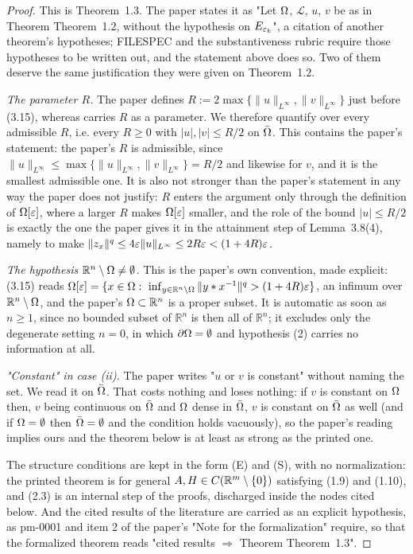 \begin{proof}
This is Theorem~1.3. The paper states it as "Let $\Omega$, $\mathcal L$, $u$, $v$ be as in
Theorem Theorem~1.2, without the hypothesis on $E_{\varepsilon_k}$", a citation of another theorem's
hypotheses; FILESPEC and the substantiveness rubric require those hypotheses to be written
out, and the statement above does so. Two of them deserve the same justification they were
given on Theorem~1.2.

\emph{The parameter $R$.} The paper defines $R:=2\max\{\|u\|_{L^\infty},\|v\|_{L^\infty}\}$
just before (3.15), whereas  carries $R$ as a parameter. We
therefore quantify over every admissible $R$, i.e. every $R\ge0$ with $|u|,|v|\le R/2$ on
$\bar{\Omega}$. This contains the paper's statement: the paper's $R$ is admissible, since
$\|u\|_{L^\infty}\le\max\{\|u\|_{L^\infty},\|v\|_{L^\infty}\}=R/2$ and likewise for $v$, and
it is the smallest admissible one. It is also not stronger than the paper's statement in any
way the paper does not justify: $R$ enters the argument only through the definition of
$\Omega[\varepsilon]$, where a larger $R$ makes $\Omega[\varepsilon]$ smaller, and the role of the bound
$|u|\le R/2$ is exactly the one the paper gives it in the attainment step of Lemma~3.8(4),
namely to make $\|z_x\|^{q}\le4\varepsilon\|u\|_{L^\infty}\le2R\varepsilon<(1+4R)\varepsilon$.

\emph{The hypothesis $\mathbb R^{n}\setminus\Omega\ne\emptyset$.} This is the paper's own
convention, made explicit: (3.15) reads
$\Omega[\varepsilon]=\{x\in\Omega:\ \inf_{y\in\mathbb R^{n}\setminus\Omega}\|y*x^{-1}\|^{q}>(1+4R)\varepsilon\}$, an
infimum over $\mathbb R^{n}\setminus\Omega$, and the paper's $\Omega\subset\mathbb R^{n}$ is a proper
subset. It is automatic as soon as $n\ge1$, since no bounded subset of $\mathbb R^{n}$ is
then all of $\mathbb R^{n}$; it excludes only the degenerate setting $n=0$, in which
$\partial\Omega=\emptyset$ and hypothesis (2) carries no information at all.

\emph{"Constant" in case (ii).} The paper writes "$u$ or $v$ is constant" without naming the
set. We read it on $\bar{\Omega}$. That costs nothing and loses nothing: if $v$ is constant on
$\Omega$ then, $v$ being continuous on $\bar{\Omega}$ and $\Omega$ dense in $\bar{\Omega}$, $v$ is constant
on $\bar{\Omega}$ as well (and if $\Omega=\emptyset$ then $\bar{\Omega}=\emptyset$ and the condition holds
vacuously), so the paper's reading implies ours and the theorem below is at least as strong
as the printed one.

The structure conditions are kept in the form (E) and (S), with no normalization: the printed
theorem is for general $A,H\in C(\mathbb R^{m}\setminus\{0\})$ satisfying (1.9) and (1.10), and
(2.3) is an internal step of the proofs, discharged inside the nodes cited below. And
the cited results of the literature are carried as an explicit hypothesis, as pm-0001 and
item 2 of the paper's "Note for the formalization" require, so that the formalized theorem
reads "cited results $\Rightarrow$ Theorem Theorem~1.3".


\end{proof}
